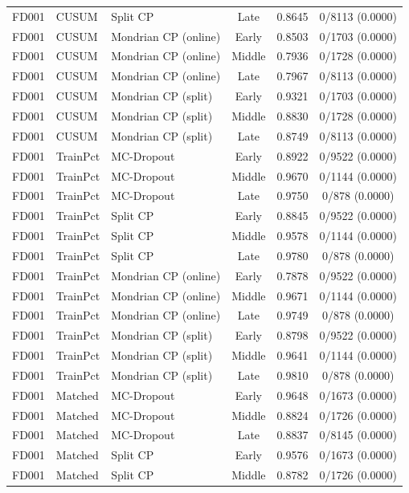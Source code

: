 \begin{table}[t]
\begin{tabular}{lllccc}
FD001 & CUSUM & Split CP & Late & 0.8645 & 0/8113 (0.0000) \\
FD001 & CUSUM & Mondrian CP (online) & Early & 0.8503 & 0/1703 (0.0000) \\
FD001 & CUSUM & Mondrian CP (online) & Middle & 0.7936 & 0/1728 (0.0000) \\
FD001 & CUSUM & Mondrian CP (online) & Late & 0.7967 & 0/8113 (0.0000) \\
FD001 & CUSUM & Mondrian CP (split) & Early & 0.9321 & 0/1703 (0.0000) \\
FD001 & CUSUM & Mondrian CP (split) & Middle & 0.8830 & 0/1728 (0.0000) \\
FD001 & CUSUM & Mondrian CP (split) & Late & 0.8749 & 0/8113 (0.0000) \\
FD001 & TrainPct & MC-Dropout & Early & 0.8922 & 0/9522 (0.0000) \\
FD001 & TrainPct & MC-Dropout & Middle & 0.9670 & 0/1144 (0.0000) \\
FD001 & TrainPct & MC-Dropout & Late & 0.9750 & 0/878 (0.0000) \\
FD001 & TrainPct & Split CP & Early & 0.8845 & 0/9522 (0.0000) \\
FD001 & TrainPct & Split CP & Middle & 0.9578 & 0/1144 (0.0000) \\
FD001 & TrainPct & Split CP & Late & 0.9780 & 0/878 (0.0000) \\
FD001 & TrainPct & Mondrian CP (online) & Early & 0.7878 & 0/9522 (0.0000) \\
FD001 & TrainPct & Mondrian CP (online) & Middle & 0.9671 & 0/1144 (0.0000) \\
FD001 & TrainPct & Mondrian CP (online) & Late & 0.9749 & 0/878 (0.0000) \\
FD001 & TrainPct & Mondrian CP (split) & Early & 0.8798 & 0/9522 (0.0000) \\
FD001 & TrainPct & Mondrian CP (split) & Middle & 0.9641 & 0/1144 (0.0000) \\
FD001 & TrainPct & Mondrian CP (split) & Late & 0.9810 & 0/878 (0.0000) \\
FD001 & Matched & MC-Dropout & Early & 0.9648 & 0/1673 (0.0000) \\
FD001 & Matched & MC-Dropout & Middle & 0.8824 & 0/1726 (0.0000) \\
FD001 & Matched & MC-Dropout & Late & 0.8837 & 0/8145 (0.0000) \\
FD001 & Matched & Split CP & Early & 0.9576 & 0/1673 (0.0000) \\
FD001 & Matched & Split CP & Middle & 0.8782 & 0/1726 (0.0000) \\

\end{tabular}
\end{table}
